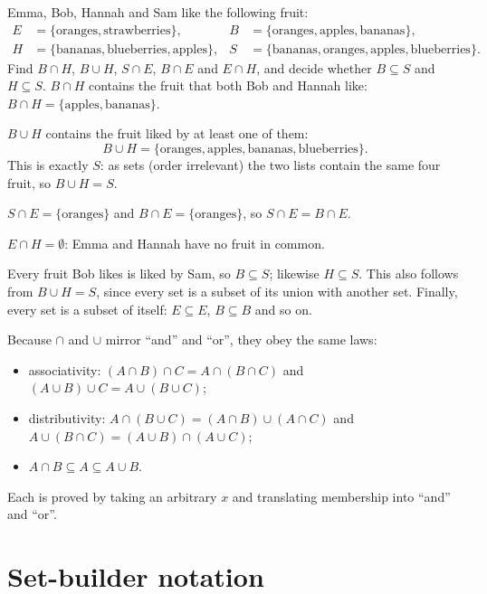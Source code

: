 \begin{example}
Emma, Bob, Hannah and Sam like the following fruit:
\begin{align*}
E&=\{\text{oranges},\text{strawberries}\}, & B&=\{\text{oranges},\text{apples},\text{bananas}\},\\
H&=\{\text{bananas},\text{blueberries},\text{apples}\}, & S&=\{\text{bananas},\text{oranges},\text{apples},\text{blueberries}\}.
\end{align*}
Find $B\cap H$, $B\cup H$, $S\cap E$, $B\cap E$ and $E\cap H$, and decide whether $B\subseteq S$ and
$H\subseteq S$. 
\solution
$B\cap H$ contains the fruit that both Bob and Hannah like: $B\cap H=\{\text{apples},\text{bananas}\}$.

$B\cup H$ contains the fruit liked by at least one of them:
\[B\cup H=\{\text{oranges},\text{apples},\text{bananas},\text{blueberries}\}.\]
This is exactly $S$: as sets
(order irrelevant) the two lists contain the same four fruit, so $B\cup H=S$.

$S\cap E=\{\text{oranges}\}$ and $B\cap E=\{\text{oranges}\}$, so $S\cap E=B\cap E$.

$E\cap H=\emptyset$: Emma and Hannah have no fruit in common.

Every fruit Bob likes is liked by Sam, so $B\subseteq S$; likewise $H\subseteq S$. This also follows from
$B\cup H=S$, since every set is a subset of its union with another set. Finally, every set is a subset of
itself: $E\subseteq E$, $B\subseteq B$ and so on.
\end{example}

\begin{external}
Because $\cap$ and $\cup$ mirror ``and'' and ``or'', they obey the same laws:
\begin{itemize}
  \item associativity: $(A\cap B)\cap C=A\cap(B\cap C)$ and $(A\cup B)\cup C=A\cup(B\cup C)$;
  \item distributivity: $A\cap(B\cup C)=(A\cap B)\cup(A\cap C)$ and $A\cup(B\cap C)=(A\cup B)\cap(A\cup C)$;
  \item $A\cap B\subseteq A\subseteq A\cup B$.
\end{itemize}
Each is proved by taking an arbitrary $x$ and translating membership into ``and'' and ``or''.
\end{external}

\section{Set-builder notation}\label{sec:set-builder}

